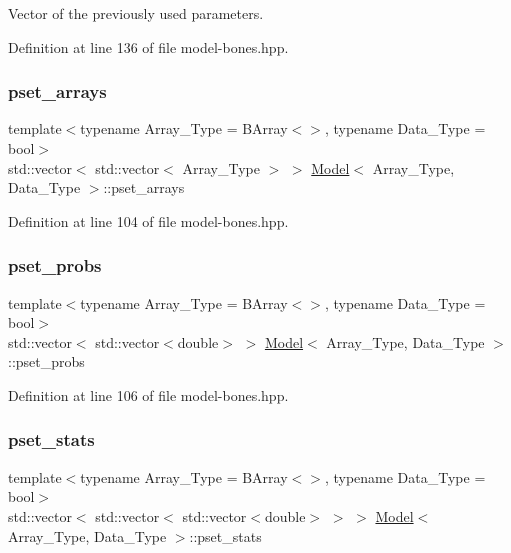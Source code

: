 Vector of the previously used parameters. 



Definition at line 136 of file model-\/bones.\+hpp.

\mbox{\label{class_model_a21c6f91330a24c2647366e21fdf89e6a}} 
\subsubsection{\texorpdfstring{pset\+\_\+arrays}{pset\_arrays}}
{\footnotesize\ttfamily template$<$typename Array\+\_\+\+Type  = B\+Array$<$$>$, typename Data\+\_\+\+Type  = bool$>$ \\
std\+::vector$<$ std\+::vector$<$ Array\+\_\+\+Type $>$ $>$ \hyperlink{class_model}{Model}$<$ Array\+\_\+\+Type, Data\+\_\+\+Type $>$\+::pset\+\_\+arrays}



Definition at line 104 of file model-\/bones.\+hpp.

\mbox{\label{class_model_a5ff31039ecd3c8c61e8315a87eebdebc}} 
\subsubsection{\texorpdfstring{pset\+\_\+probs}{pset\_probs}}
{\footnotesize\ttfamily template$<$typename Array\+\_\+\+Type  = B\+Array$<$$>$, typename Data\+\_\+\+Type  = bool$>$ \\
std\+::vector$<$ std\+::vector$<$double$>$ $>$ \hyperlink{class_model}{Model}$<$ Array\+\_\+\+Type, Data\+\_\+\+Type $>$\+::pset\+\_\+probs}



Definition at line 106 of file model-\/bones.\+hpp.

\mbox{\label{class_model_aa18c30611ad6382a94076c5438ec5e37}} 
\subsubsection{\texorpdfstring{pset\+\_\+stats}{pset\_stats}}
{\footnotesize\ttfamily template$<$typename Array\+\_\+\+Type  = B\+Array$<$$>$, typename Data\+\_\+\+Type  = bool$>$ \\
std\+::vector$<$ std\+::vector$<$ std\+::vector$<$double$>$ $>$ $>$ \hyperlink{class_model}{Model}$<$ Array\+\_\+\+Type, Data\+\_\+\+Type $>$\+::pset\+\_\+stats}



